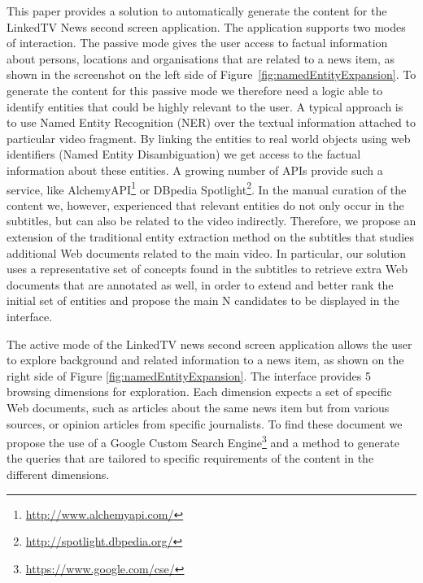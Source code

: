 \documentclass{llncs}
\begin{document}
This paper provides a solution to automatically generate the content for the LinkedTV News second screen application. The application supports two modes of interaction. The passive mode gives the user access to factual information about persons, locations and organisations that are related to a news item, as shown in the screenshot on the left side of Figure~\ref{fig:namedEntityExpansion}. To generate the content for this passive mode we therefore need a logic able to identify entities that could be highly relevant to the user. A typical approach is to use Named Entity Recognition (NER) over the textual information attached to particular video fragment. By linking the entities to real world objects using web identifiers (Named Entity Disambiguation) we get access to the factual information about these entities. A growing number of APIs provide such a service, like AlchemyAPI\footnote{\fontsize{8pt}{1em}\selectfont \url{http://www.alchemyapi.com/}} or DBpedia Spotlight\footnote{\fontsize{8pt}{1em}\selectfont \url{http://spotlight.dbpedia.org/}}. %
In the manual curation of the content we, however, experienced that relevant entities do not only occur in the subtitles, but can also be related to the video indirectly. Therefore, we propose an extension of the traditional entity extraction method on the subtitles that studies additional Web documents related to the main video. In particular, our solution uses a representative set of concepts found in the subtitles to retrieve extra Web documents that are annotated as well, in order to extend and better rank the initial set of entities and propose the main N candidates to be displayed in the interface.

The active mode of the LinkedTV news second screen application allows the user to explore background and related information to a news item, as shown on the right side of Figure \ref{fig:namedEntityExpansion}. The interface provides 5 browsing dimensions for exploration. Each dimension expects a set of specific Web documents, such as articles about the same news item but from various sources, or opinion articles from specific journalists. To find these document we propose the use of a Google Custom Search Engine\footnote{\fontsize{8pt}{1em}\selectfont  \url{https://www.google.com/cse/}} and a method to generate the queries that are tailored to specific requirements of the content in the different dimensions.
\end{document}
